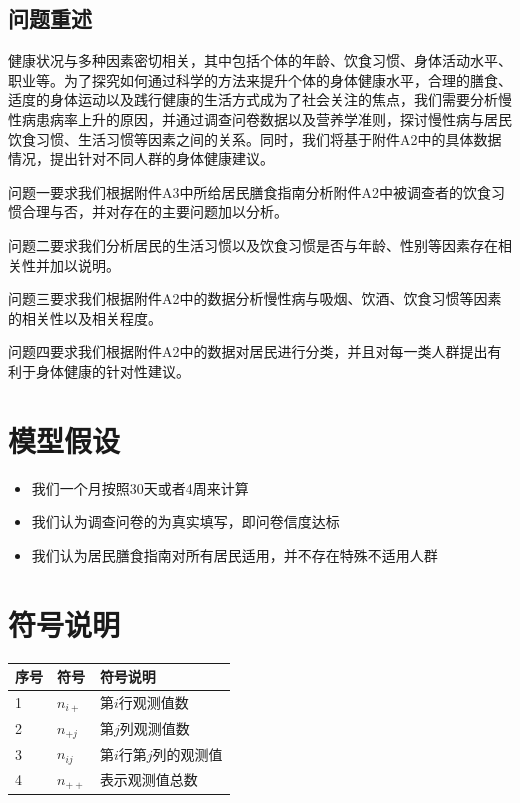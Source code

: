 \documentclass{cumcmthesis}
\begin{document}
\subsection{问题重述}


健康状况与多种因素密切相关，其中包括个体的年龄、饮食习惯、身体活动水平、职业等。为了探究如何通过科学的方法来提升个体的身体健康水平，合理的膳食、适度的身体运动以及践行健康的生活方式成为了社会关注的焦点，我们需要分析慢性病患病率上升的原因，并通过调查问卷数据以及营养学准则，探讨慢性病与居民饮食习惯、生活习惯等因素之间的关系。同时，我们将基于附件A2中的具体数据情况，提出针对不同人群的身体健康建议。

问题一要求我们根据附件A3中所给居民膳食指南分析附件A2中被调查者的饮食习惯合理与否，并对存在的主要问题加以分析。

问题二要求我们分析居民的生活习惯以及饮食习惯是否与年龄、性别等因素存在相关性并加以说明。

问题三要求我们根据附件A2中的数据分析慢性病与吸烟、饮酒、饮食习惯等因素的相关性以及相关程度。

问题四要求我们根据附件A2中的数据对居民进行分类，并且对每一类人群提出有利于身体健康的针对性建议。
\section{模型假设}

\begin{itemize}
\item 我们一个月按照30天或者4周来计算
\item 我们认为调查问卷的为真实填写，即问卷信度达标
\item 我们认为居民膳食指南对所有居民适用，并不存在特殊不适用人群
\end{itemize}

\section{符号说明}
\begin{table}[H]
  \centering
  \begin{tabular}{p{60pt}<{\centering}|p{60pt}<{\centering}p{180pt}<{\raggedright}}
   \hline
    序号 & 符号 & 符号说明 \\
   \hline
    1 & $n_{i+}$&第$i$行观测值数\\
    2&$n_{+j}$&第$j$列观测值数\\
    3&$n_{ij}$&第$i$行第$j$列的观测值\\
    4&$n_{++}$&表示观测值总数 \\
    \hline
  \end{tabular}
  \label{symbol}
\end{table}
\end{document}
